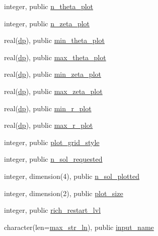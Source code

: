 \begin{DoxyCompactItemize}
integer, public \hyperlink{namespacenum__vars_a0c3d2a6eea73c4d47f30df016475b585}{n\+\_\+theta\+\_\+plot}
\item 
integer, public \hyperlink{namespacenum__vars_a657b74ac497053e3c848796f1afaca5f}{n\+\_\+zeta\+\_\+plot}
\item 
real(\hyperlink{namespacenum__vars_a03802aa2bd86439d7a9370836fabf3f2}{dp}), public \hyperlink{namespacenum__vars_a2085f22558c1b4a349b5ad1b6abfe09f}{min\+\_\+theta\+\_\+plot}
\item 
real(\hyperlink{namespacenum__vars_a03802aa2bd86439d7a9370836fabf3f2}{dp}), public \hyperlink{namespacenum__vars_ade6d14ac98ba7f573ef83194808f68b8}{max\+\_\+theta\+\_\+plot}
\item 
real(\hyperlink{namespacenum__vars_a03802aa2bd86439d7a9370836fabf3f2}{dp}), public \hyperlink{namespacenum__vars_a773a55cfd780f1f9db69887fdf48b0a5}{min\+\_\+zeta\+\_\+plot}
\item 
real(\hyperlink{namespacenum__vars_a03802aa2bd86439d7a9370836fabf3f2}{dp}), public \hyperlink{namespacenum__vars_a2c2f75ebac91c6e5e122e41a62b71b6d}{max\+\_\+zeta\+\_\+plot}
\item 
real(\hyperlink{namespacenum__vars_a03802aa2bd86439d7a9370836fabf3f2}{dp}), public \hyperlink{namespacenum__vars_ab3369f21aa4433cb6dc08957e477c015}{min\+\_\+r\+\_\+plot}
\item 
real(\hyperlink{namespacenum__vars_a03802aa2bd86439d7a9370836fabf3f2}{dp}), public \hyperlink{namespacenum__vars_a1f9d7347043448d30c6612558ae569e5}{max\+\_\+r\+\_\+plot}
\item 
integer, public \hyperlink{namespacenum__vars_a0e40187c6517fb55cc756c5656327fb9}{plot\+\_\+grid\+\_\+style}
\item 
integer, public \hyperlink{namespacenum__vars_a3deb68d5c9cd3a99c9dd779e18c4d129}{n\+\_\+sol\+\_\+requested}
\item 
integer, dimension(4), public \hyperlink{namespacenum__vars_a98df35edce5a42616685bb1ebd508c79}{n\+\_\+sol\+\_\+plotted}
\item 
integer, dimension(2), public \hyperlink{namespacenum__vars_a3bd355d04302c5d45685a0e1e3f6b1f6}{plot\+\_\+size}
\item 
integer, public \hyperlink{namespacenum__vars_ac4bc885e8034c285bf0a9b76a832a738}{rich\+\_\+restart\+\_\+lvl}
\item 
character(len=\hyperlink{namespacenum__vars_a3ff2bb983ee80a6735277d6789e6ce7c}{max\+\_\+str\+\_\+ln}), public \hyperlink{namespacenum__vars_a1a16a5fdda7aaacdffd14f1ad29f5e8b}{input\+\_\+name}

\end{DoxyCompactItemize}
